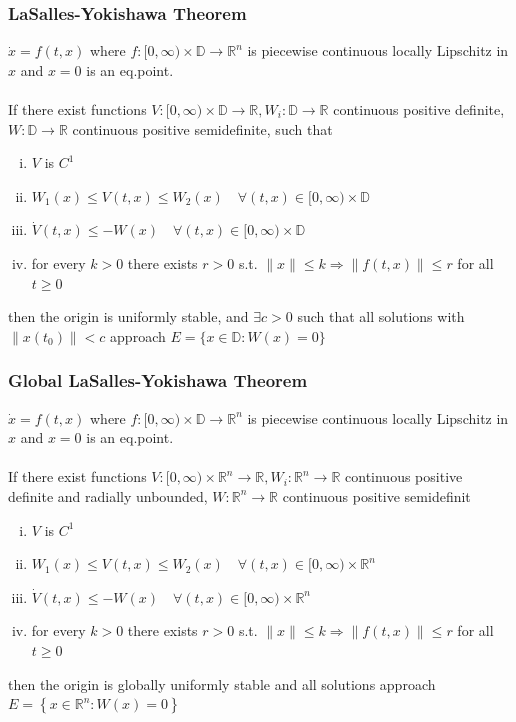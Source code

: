 \documentclass{article}
\begin{document}
\subsubsection{LaSalles-Yokishawa Theorem}
$\dot x = f(t, x)$ where $f:[0, \infty) \times \mathbb{D} \rightarrow \mathbb{R}^n$ is piecewise continuous locally Lipschitz in $x$ and $x=0$ is an eq.point.
\\\\
If there exist functions $V:[0, \infty) \times \mathbb{D} \rightarrow \mathbb{R}, W_i: \mathbb{D} \rightarrow \mathbb{R}$ continuous positive definite, $W: \mathbb{D} \rightarrow \mathbb{R}$ continuous positive semidefinite, such that
\begin{enumerate}[i)]
	\item $V$ is $C^1$
	\item $W_1(x) \leq V(t, x) \leq W_2(x) \quad \forall(t, x) \in[0, \infty) \times \mathbb{D}$
	\item $\dot{V}(t, x) \leq-W(x) \quad \forall(t, x) \in[0, \infty) \times \mathbb{D}$
	\item for every $k>0$ there exists $r>0$ s.t. $\|x\| \leq k \Longrightarrow\|f(t,
		      x)\| \leq r$ for all $t \geq 0$
\end{enumerate}
then the origin is uniformly stable, and $\exists c>0$ such that all solutions with $\left\|x\left(t_0\right)\right\|<c$ approach $E=\{x \in \mathbb{D}: W(x)=0\}$
\subsubsection{Global LaSalles-Yokishawa Theorem}
$\dot x = f(t, x)$ where $f:[0, \infty) \times \mathbb{D} \rightarrow \mathbb{R}^n$ is piecewise continuous locally Lipschitz in $x$ and $x=0$ is an eq.point.
\\\\
If there exist functions $V:[0, \infty) \times \mathbb{R}^n \rightarrow \mathbb{R}, W_i: \mathbb{R}^n \rightarrow \mathbb{R}$ continuous positive definite and radially unbounded, $W: \mathbb{R}^n \rightarrow \mathbb{R}$ continuous positive semidefinit
\begin{enumerate}[i)]
	\item $V$ is $C^1$
	\item $W_1(x) \leq V(t, x) \leq W_2(x) \quad \forall(t, x) \in[0, \infty) \times \mathbb{R}^n$
	\item $\dot{V}(t, x) \leq-W(x) \quad \forall(t, x) \in[0, \infty) \times \mathbb{R}^n$
	\item for every $k>0$ there exists $r>0$ s.t. $\|x\| \leq k \Longrightarrow\|f(t,
		      x)\| \leq r$ for all $t \geq 0$
\end{enumerate}
then the origin is globally uniformly stable and all solutions approach $E=\left\{x \in \mathbb{R}^n: W(x)=0\right\}$
\end{document}
